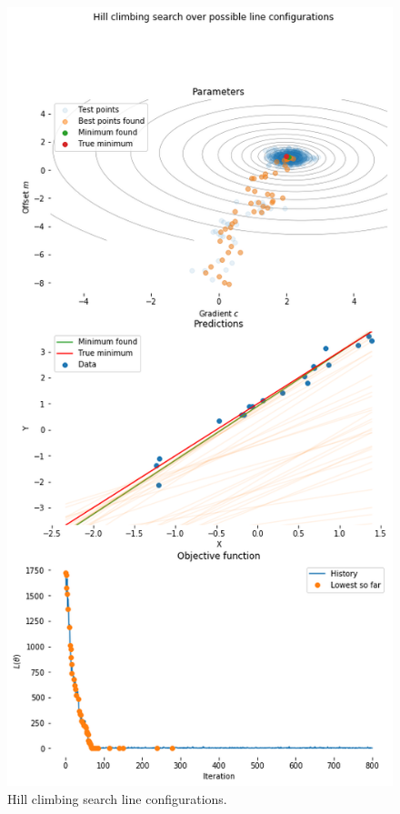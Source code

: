 \documentclass[a4paper, openany]{memoir}
\begin{document}
\begin{figure}[H]
    \centering
    \includegraphics[scale=0.5]{src/4.17 hill climbing search line configurations.png}
    \caption{Hill climbing search line configurations.}
\end{figure}
\end{document}
